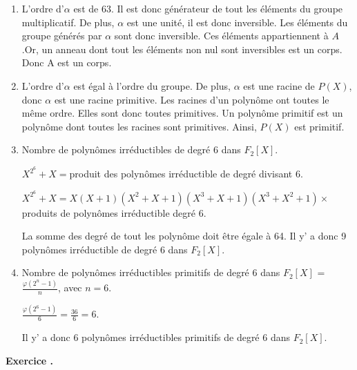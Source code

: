 \documentclass[a4paper,10pt]{article}
\newcounter{exercice}
\newcommand{\exercice}{%
		\refstepcounter{exercice}%
		\bigskip
		\bigskip
		\noindent\textbf{Exercice \theexercice.}~%
	}
\begin{document}
\begin{enumerate}
	\item
	L'ordre d'$\alpha$ est de 63. Il est donc générateur de tout les éléments du groupe multiplicatif. De plus, $\alpha$ est une unité, il est donc inversible. Les éléments du groupe générés par $\alpha$ sont donc inversible. Ces éléments appartiennent à $A$.Or, un anneau dont tout les éléments non nul sont inversibles est un corps. Donc A est un corps.
	\item
	L'ordre d'$\alpha$ est égal à l'ordre du groupe. De plus, $\alpha$ est une racine de $P(X)$, donc $\alpha$ est une racine primitive. Les racines d'un polynôme ont toutes le même ordre. Elles sont donc toutes primitives. Un polynôme primitif est un polynôme dont toutes les racines sont primitives. Ainsi, $P(X)$ est primitif.
	\item
Nombre de polynômes irréductibles de degré 6 dans $F_2[X]$.

$X^{2^6}+X=$produit des polynômes irréductible de degré divisant 6.

$X^{2^6}+X=X(X+1)(X^2+X+1)(X^3+X+1)(X^3+X^2+1)\times $produits de polynômes irréductible degré 6.

La somme des degré de tout les polynôme doit être égale à 64. Il y' a donc 9 polynômes irréductible de degré 6 dans $F_2[X]$.
	\item
Nombre de polynômes irréductibles primitifs de degré 6 dans $F_2[X]$ = $\frac{\varphi(2^n-1)}{n}$, avec $n=6$.


 $\frac{\varphi(2^6-1)}{6}=\frac{36}{6}=6$.
 
 Il y' a donc 6 polynômes irréductibles primitifs de degré 6 dans $F_2[X]$.

	\end{enumerate}	
	\exercice
\end{document}

